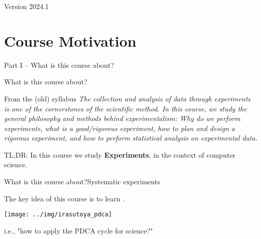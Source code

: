 \documentclass[aspectratio=169]{beamer}
\subtitle[Intro]{Topic 00 - Course Introduction}
\date{2024/04/19}
\begin{document}

\begin{frame}
  \maketitle

  \vfill

  \hfill Version 2024.1
\end{frame}

\section{Course Motivation}

\begin{frame}
  \begin{center}
    Part I -- What is this course about?
  \end{center}
\end{frame}

\begin{frame}{What is this course about?}

  \begin{block}{From the (old) syllabus}
    \emph{The collection and analysis of data through experiments is
      one of the cornerstones of the scientific method. In this
      course, we study the general philosophy and methods behind
      experimentalism: Why do we perform experiments, what is a
      good/rigorous experiment, how to plan and design a rigorous
      experiment, and how to perform statistical analysis on
      experimental data.}
  \end{block}
  \bigskip

  TL;DR: In this course we study {\bf Experiments}, in the context of computer science.
\end{frame}

\begin{frame}{What is this course about?}{Systematic experiments}

  The key idea of this course is to learn .\bigskip

  \begin{center}
    \texttt{[image: ../img/irasutoya\_pdca]}
  \end{center}\bigskip

  i.e., "how to apply the PDCA cycle for science?"
\end{frame}
\end{document}

